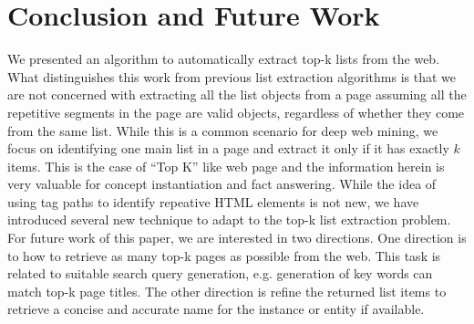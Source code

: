\section{Conclusion and Future Work}
We presented an algorithm to automatically extract top-k lists from
the web. What distinguishes this work from previous list extraction
algorithms is that we are not concerned with extracting all the list objects
from a page assuming all the repetitive segments in the page are valid objects,
regardless of whether they come from the same list. While this is a common
scenario for deep web mining, we focus on identifying one main list in 
a page and extract it only if it has exactly $k$ items. This is the case
of ``Top K'' like web page and the information herein is very valuable for
concept instantiation and fact answering. While the idea of using 
tag paths to identify repeative HTML elements is not new, 
we have introduced several new technique to adapt to the top-k list extraction
problem. For future work of this paper, we are interested in
two directions. One direction is to how to retrieve as many top-k pages as
possible from the web. This task is related to suitable search
query generation, e.g. generation of key words can match top-k page titles.
The other direction is refine the returned list items to retrieve a concise
and accurate name for the instance or entity if available.

